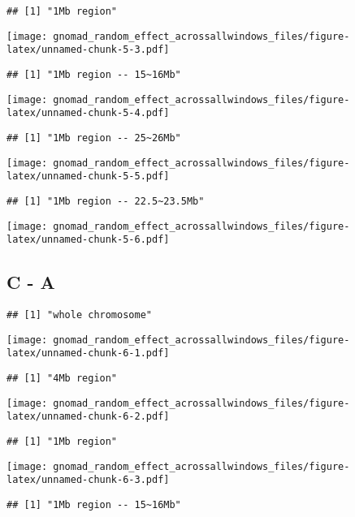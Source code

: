 \documentclass[
]{article}
\begin{document}
\begin{verbatim}
## [1] "1Mb region"
\end{verbatim}

\texttt{[image: gnomad\_random\_effect\_acrossallwindows\_files/figure-latex/unnamed-chunk-5-3.pdf]}

\begin{verbatim}
## [1] "1Mb region -- 15~16Mb"
\end{verbatim}

\texttt{[image: gnomad\_random\_effect\_acrossallwindows\_files/figure-latex/unnamed-chunk-5-4.pdf]}

\begin{verbatim}
## [1] "1Mb region -- 25~26Mb"
\end{verbatim}

\texttt{[image: gnomad\_random\_effect\_acrossallwindows\_files/figure-latex/unnamed-chunk-5-5.pdf]}

\begin{verbatim}
## [1] "1Mb region -- 22.5~23.5Mb"
\end{verbatim}

\texttt{[image: gnomad\_random\_effect\_acrossallwindows\_files/figure-latex/unnamed-chunk-5-6.pdf]}

\hypertarget{c---a}{%
\subsection{C - A}\label{c---a}}

\begin{verbatim}
## [1] "whole chromosome"
\end{verbatim}

\texttt{[image: gnomad\_random\_effect\_acrossallwindows\_files/figure-latex/unnamed-chunk-6-1.pdf]}

\begin{verbatim}
## [1] "4Mb region"
\end{verbatim}

\texttt{[image: gnomad\_random\_effect\_acrossallwindows\_files/figure-latex/unnamed-chunk-6-2.pdf]}

\begin{verbatim}
## [1] "1Mb region"
\end{verbatim}

\texttt{[image: gnomad\_random\_effect\_acrossallwindows\_files/figure-latex/unnamed-chunk-6-3.pdf]}

\begin{verbatim}
## [1] "1Mb region -- 15~16Mb"
\end{verbatim}
\end{document}
